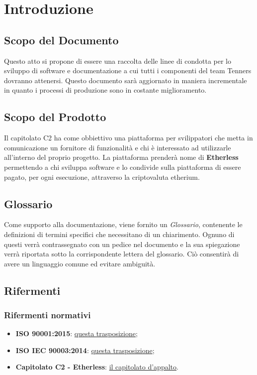 \section{Introduzione}

\subsection{Scopo del Documento}
Questo atto si propone di essere una raccolta delle linee di condotta per lo
sviluppo di software e documentazione a cui tutti i componenti del team Tenners
dovranno attenersi.
Questo documento sar\`a aggiornato in maniera incrementale in quanto i processi
di produzione sono in costante miglioramento.

\subsection{Scopo del Prodotto}
Il capitolato C2 ha come obbiettivo una piattaforma per svilippatori che metta
in comunicazione un fornitore di funzionalit\`a e chi \`e interessato ad utilizzarle
all'interno del proprio progetto.
La piattaforma prender\`a nome di \textbf{Etherless} permettendo a chi sviluppa software e
lo condivide sulla piattaforma di essere pagato, per ogni esecuzione, attraverso
la criptovaluta etherium.


\subsection{Glossario}
Come supporto alla documentazione, viene fornito un \textit{Glossario}\docs,
contenente le definizioni di termini specifici che necessitano di un chiarimento.
Ognuno di questi verr\`a contrassegnato con un pedice \glo nel documento e la sua
spiegazione verr\`a riportata sotto la corrispondente lettera del glossario. Ci\`o
consentir\`a di avere un linguaggio comune ed evitare ambiguit\`a.

\subsection{Rifermenti}
\subsubsection{Rifermenti normativi}
\begin{itemize}
  \item \textbf{ISO 90001:2015}: \href{https://www.praxiom.com/iso-9001.htm}{questa trasposizione};
  \item \textbf{ISO IEC 90003:2014}: \href{https://www.praxiom.com/iso-90003.htm}{questa trasposizione};
  \item \textbf{Capitolato C2 - Etherless}: \href{https://www.math.unipd.it/~tullio/IS-1/2019/Progetto/C2.pdf}{il capitolato d'appalto}.
\end{itemize}

